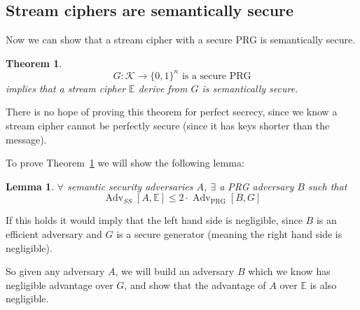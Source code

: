 \documentclass[10pt,a4paper]{report}
\newtheorem{theorem}{Theorem}[section]
\newtheorem{lemma}{Lemma}[section]
\begin{document}
\subsection{Stream ciphers are semantically secure}

Now we can show that a stream cipher with a secure PRG is semantically secure.

\begin{theorem}
    $$ G \colon \mathcal{K} \to \{0, 1\}^n \text{ is a secure PRG} $$
    implies that a stream cipher $\mathbb{E}$ derive from $G$ is semantically secure.
    \label{theorem:stream_ciphers_are_semantically_secure}
\end{theorem}

There is no hope of proving this theorem for perfect secrecy, since we know a stream cipher cannot
be perfectly secure (since it has keys shorter than the message).

To prove Theorem~\ref{theorem:stream_ciphers_are_semantically_secure} we will show the following
lemma:

\begin{lemma}
    $\forall $ semantic security adversaries $A$, $\exists$ a PRG adversary $B$ such that
    $$ \operatorname{Adv}_{SS}[A, \mathbb{E}] \leq 2 \cdot \operatorname{Adv}_{\text{PRG}}[B, G] $$
    \label{lemma:adv_a_less_adv_b}
\end{lemma}

If this holds it would imply that the left hand side is negligible, since $B$ is an efficient
adversary and $G$ is a secure generator (meaning the right hand side is negligible).

So given any adversary $A$, we will build an adversary $B$ which we know has negligible advantage
over $G$, and show that the advantage of $A$ over $\mathbb{E}$ is also negligible.
\end{document}

